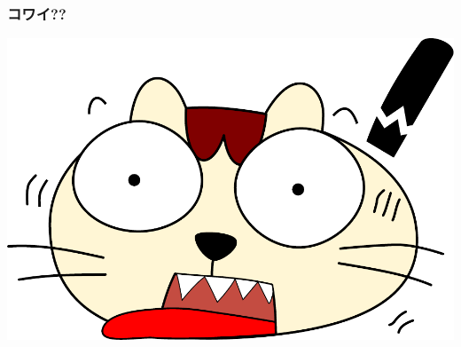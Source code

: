 \documentclass[12pt,dvipdfmx]{beamer}
\begin{document}
\begin{frame}
\frametitle{コワイ??}

\begin{center}
\includegraphics[width=\textwidth]{out/pdf/svg/cat.pdf}
\end{center}

\end{frame}
\end{document}
